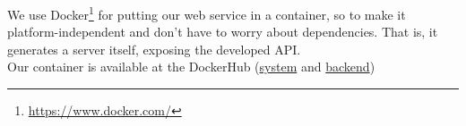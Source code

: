 We use Docker\footnote{\href{https://www.docker.com/}{https://www.docker.com/}} for putting our web service in a container,
so to make it platform-independent and don't have to worry about dependencies.
That is, it generates a server itself, exposing the developed API.\\
Our container is available at the DockerHub (\href{https://hub.docker.com/r/barahnofal/cs582-recommender_client}{system} and \href{https://hub.docker.com/r/barahnofal/cs582-recommender_api}{backend})